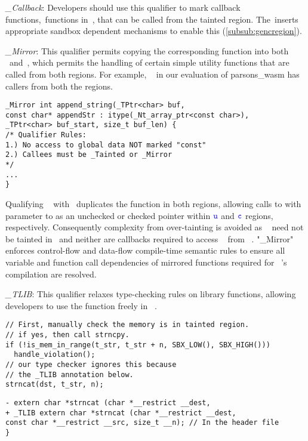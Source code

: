 \noindent\emph{\_Callback}:
Developers should use this qualifier to mark callback functions,~\ie functions in~\cregion, that can be called from the tainted region. 
The~\sourcerewriter inserts appropriate sandbox dependent mechanisms to enable this (\ref{subsub:gencregion}).

\noindent\emph{\_Mirror}: 
This qualifier permits copying the corresponding function into both ~\cregion and~\ucregion, which permits the handling of certain simple utility functions that are called from both regions. For example, ~ in our evaluation of parsons\_wasm has callers from both the regions. 
\begin{verbatim}
_Mirror int append_string(_TPtr<char> buf,
const char* appendStr : itype(_Nt_array_ptr<const char>),
_TPtr<char> buf_start, size_t buf_len) {
/* Qualifier Rules:
1.) No access to global data NOT marked "const"
2.) Callees must be _Tainted or _Mirror
*/
...
}

\end{verbatim}
Qualifying ~ with~ duplicates the function in both regions, allowing calls to  with parameter to  as an unchecked or checked pointer within $\textcolor{blue}{\texttt{u}}$ and $\textcolor{blue}{\texttt{c}}$ regions, respectively. Consequently complexity from over-tainting is avoided as ~ need not be tainted in ~\cregion and neither are callbacks required to access ~ from ~\ucregion.   
"\_Mirror" enforces control-flow and data-flow compile-time semantic rules to ensure all variable and function call dependencies of mirrored functions required for ~\ucregion's compilation are resolved. 

\noindent\emph{\_TLIB}:
This qualifier relaxes type-checking rules on library functions, allowing developers to use the function freely in ~\cregion.
\begin{verbatim}
// First, manually check the memory is in tainted region.
// if yes, then call strncpy.
if (!is_mem_in_range(t_str, t_str + n, SBX_LOW(), SBX_HIGH()))
  handle_violation();
// our type checker ignores this because 
// the _TLIB annotation below.
strncat(dst, t_str, n);
\end{verbatim}

\begin{verbatim}
- extern char *strncat (char *__restrict __dest,
+ _TLIB extern char *strncat (char *__restrict __dest,
const char *__restrict __src, size_t __n); // In the header file
}
\end{verbatim}

